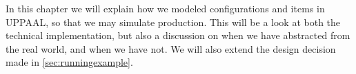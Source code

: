 In this chapter we will explain how we modeled configurations and items in UPPAAL, so that we may simulate production. This will be a look at both the technical implementation, but also a discussion on when we have abstracted from the real world, and when we have not. We will also extend the design decision made in \cref{sec:runningexample}. 





